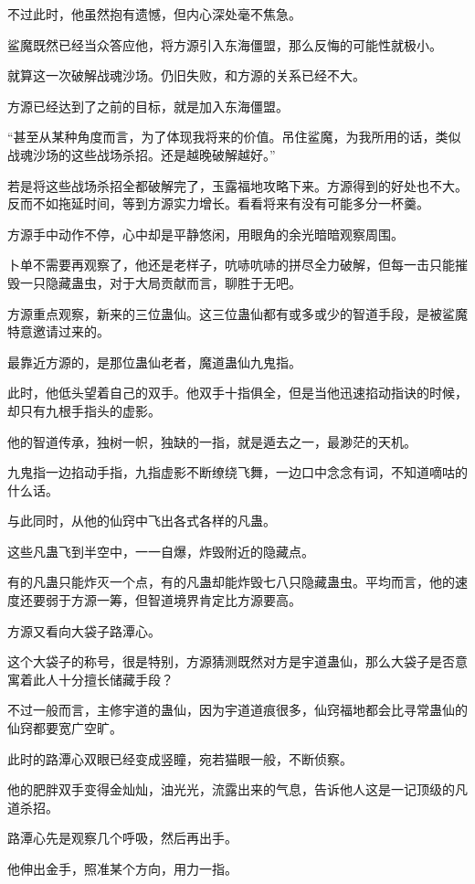 \begin{this_body}
不过此时，他虽然抱有遗憾，但内心深处毫不焦急。

鲨魔既然已经当众答应他，将方源引入东海僵盟，那么反悔的可能性就极小。

就算这一次破解战魂沙场。仍旧失败，和方源的关系已经不大。

方源已经达到了之前的目标，就是加入东海僵盟。

“甚至从某种角度而言，为了体现我将来的价值。吊住鲨魔，为我所用的话，类似战魂沙场的这些战场杀招。还是越晚破解越好。”

若是将这些战场杀招全都破解完了，玉露福地攻略下来。方源得到的好处也不大。反而不如拖延时间，等到方源实力增长。看看将来有没有可能多分一杯羹。

方源手中动作不停，心中却是平静悠闲，用眼角的余光暗暗观察周围。

卜单不需要再观察了，他还是老样子，吭哧吭哧的拼尽全力破解，但每一击只能摧毁一只隐藏蛊虫，对于大局贡献而言，聊胜于无吧。

方源重点观察，新来的三位蛊仙。这三位蛊仙都有或多或少的智道手段，是被鲨魔特意邀请过来的。

最靠近方源的，是那位蛊仙老者，魔道蛊仙九鬼指。

此时，他低头望着自己的双手。他双手十指俱全，但是当他迅速掐动指诀的时候，却只有九根手指头的虚影。

他的智道传承，独树一帜，独缺的一指，就是遁去之一，最渺茫的天机。

九鬼指一边掐动手指，九指虚影不断缭绕飞舞，一边口中念念有词，不知道嘀咕的什么话。

与此同时，从他的仙窍中飞出各式各样的凡蛊。

这些凡蛊飞到半空中，一一自爆，炸毁附近的隐藏点。

有的凡蛊只能炸灭一个点，有的凡蛊却能炸毁七八只隐藏蛊虫。平均而言，他的速度还要弱于方源一筹，但智道境界肯定比方源要高。

方源又看向大袋子路潭心。

这个大袋子的称号，很是特别，方源猜测既然对方是宇道蛊仙，那么大袋子是否意寓着此人十分擅长储藏手段？

不过一般而言，主修宇道的蛊仙，因为宇道道痕很多，仙窍福地都会比寻常蛊仙的仙窍都要宽广空旷。

此时的路潭心双眼已经变成竖瞳，宛若猫眼一般，不断侦察。

他的肥胖双手变得金灿灿，油光光，流露出来的气息，告诉他人这是一记顶级的凡道杀招。

路潭心先是观察几个呼吸，然后再出手。

他伸出金手，照准某个方向，用力一指。


\end{this_body}
